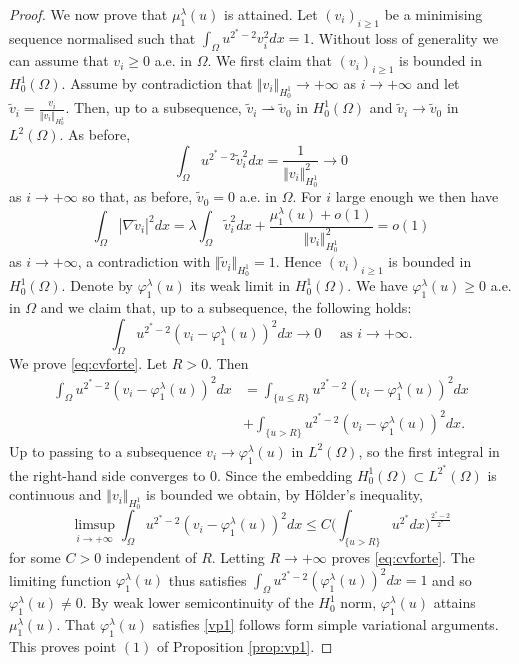 \documentclass[10pt]{amsart}
\numberwithin{equation}{section}
\newcommand{\vp}{\varphi}
\newcommand{\Om}{\Omega}
\theoremstyle{plain}
\theoremstyle{remark}
\begin{document}
\begin{proof}
We now prove that $ \mu_{1}^{\lambda}(u)$ is attained. Let $(v_i)_{i\ge1}$ be a minimising sequence normalised such that $\int_\Om u^{2^*-2} v_i^2 dx = 1$. Without loss of generality we can assume that $v_i \ge0$ a.e. in $\Om$. We first claim that $(v_i)_{i\ge1}$ is bounded in $H^1_0(\Om)$. Assume by contradiction that $\Vert v_i \Vert_{H^1_0} \to + \infty$ as $i \to + \infty$ and let $\tilde{v}_i = \frac{v_i}{\Vert v_i\Vert_{H^1_0}}$. Then, up to a subsequence, $\tilde{v}_i \rightharpoonup \tilde{v}_0$ in $H^1_0(\Om)$ and $\tilde{v}_i \to \tilde{v}_0$ in $L^2(\Om)$. As before, 
$$ \int_{\Om} u^{2^*-2} \tilde{v}_i^2dx = \frac{1}{\Vert v_i \Vert_{H^1_0}^2} \to 0 $$
as $i \to + \infty$ so that, as before, $\tilde{v}_0 = 0$ a.e. in $\Om$. For $i$ large enough we then have 
$$ \int_{\Om} |\nabla \tilde{v}_i|^2 dx = \lambda \int_{\Om} \tilde{v}_i^2dx +  \frac{\mu_1^{\lambda}(u)+ o(1)}{\Vert v_i \Vert_{H^1_0}^2}= o(1)$$ 
as $i \to + \infty$, a contradiction with $\Vert \tilde{v}_i \Vert_{H^1_0} = 1$. Hence $(v_i)_{i\ge1}$ is bounded in $H^1_0(\Om)$. Denote by $\vp_1^\lambda(u)$ its weak limit in $H^1_0(\Om)$. We have $\vp_1^{\lambda}(u) \ge0$ a.e. in $\Om$ and we claim that, up to a subsequence, the following holds:
\begin{equation} \label{eq:cvforte}
\int_{\Om} u^{2^*-2}(v_i - \vp_1^\lambda(u))^2dx \to 0 \quad \text{ as } i \to + \infty. 
\end{equation}
We prove \eqref{eq:cvforte}. Let $R>0$. Then
$$ \begin{aligned}
\int_{\Om} u^{2^*-2}(v_i - \vp_1^{\lambda}(u))^2dx &= \int_{\{u \le R \}} u^{2^*-2}(v_i - \vp_1^{\lambda}(u))^2dx \\
&+ \int_{\{ u>R\}} u^{2^*-2}(v_i - \vp_1^\lambda(u))^2dx.
\end{aligned} $$
Up to passing to a subsequence $v_i \to \vp_1^\lambda(u)$ in $L^2(\Om)$, so the first integral in the right-hand side converges to $0$. Since the embedding $H^1_0(\Om) \subset L^{2^*}(\Om)$ is continuous and $\Vert v_i \Vert_{H^1_0} $ is bounded we obtain, by H\"older's inequality,
$$ \limsup_{i \to + \infty}\int_{\Om} u^{2^*-2}(v_i - \vp_1^\lambda(u))^2dx \le C \Big( \int_{\{u >R\}} u^{2^*}dx \Big)^{\frac{2^*-2}{2^*}} $$
for some $C>0$ independent of $R$. Letting $R \to + \infty$ proves \eqref{eq:cvforte}. The limiting function $\vp_1^\lambda(u)$ thus satisfies $\int_{\Om} u^{2^*-2} (\vp_1^{\lambda}(u))^2dx = 1$ and so $\vp_1^{\lambda}(u) \neq 0$. By weak lower semicontinuity of the $H^1_0$ norm,  $\vp_1^{\lambda}(u)$ attains $\mu_1^{\lambda}(u)$. That $\vp_1^{\lambda}(u)$ satisfies \eqref{vp1} follows form simple variational arguments. This proves point $(1)$ of Proposition \ref{prop:vp1}.



\end{proof}
\end{document}

